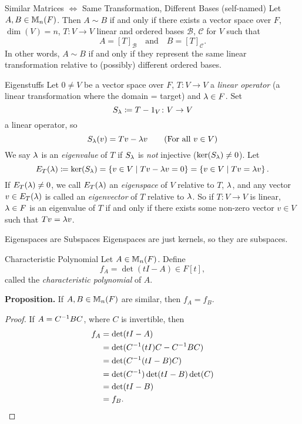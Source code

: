 \documentclass[class=article, crop=false]{standalone}
\begin{document}
  \begin{theorem}{Similar Matrices $\iff$ Same Transformation, Different Bases (self-named)}
    Let $A, B\in \mathbb{M}_n(F)$. Then $A\sim B$ if and only if there exists a vector space over $F$, $\dim(V) = n$, $T\colon V\to V$ linear and ordered bases $\mathcal{B}$, $\mathcal{C}$ for $V$ such that
    \[
      A = [T]_{\mathcal{B}}\quad \text{and} \quad B = [T]_{\mathcal{C}}.
    \]
    In other words, $A\sim B$ if and only if they represent the same linear transformation relative to (possibly) different ordered bases.
  \end{theorem}
  \begin{definition}{Eigenstuffs}
    Let $0\neq V$ be a vector space over $F$, $T\colon V\to V$ a \emph{linear operator} (a linear transformation where the domain = target) and $\lambda\in F$. Set
    \[
      S_{\lambda}\coloneqq T - 1_V\colon V\to V
    \]
    a linear operator, so
    \[
      S_{\lambda}(v) = Tv - \lambda v \tag{For all $v\in V$}
    \]
    We say $\lambda$ is an \emph{eigenvalue} of $T$ if $S_{\lambda}$ is \emph{not} injective ($\ker(S_{\lambda})\neq 0$).
    Let
    \[
      E_T(\lambda)\coloneqq \ker(S_{\lambda}) = \left\{v\in V\mid Tv - \lambda v = 0\right\} = \left\{v\in V\mid Tv = \lambda v\right\}.
    \]
    If $E_T(\lambda)\neq 0$, we call $E_T(\lambda)$ an \emph{eigenspace} of $V$ relative to $T$, $\lambda$, and any vector $v\in E_T(\lambda)$ is called an \emph{eigenvector} of $T$ relative to $\lambda$. So if $T\colon V\to V$ is linear, $\lambda\in F$ is an eigenvalue of $T$ if and only if there exists some non-zero vector $v\in V$ such that $Tv = \lambda v$.
  \end{definition}
  \begin{note}{Eigenspaces are Subspaces}
    Eigenspaces are just kernels, so they are subspaces.
  \end{note}
  \begin{definition}{Characteristic Polynomial}
    Let $A\in \mathbb{M}_n(F)$. Define
    \[
      f_A = \det(tI - A)\in F[t],
    \]
    called the \emph{characteristic polynomial} of $A$.
  \end{definition}
  \textbf{Proposition.} If $A, B\in \mathbb{M}_n(F)$ are similar, then $f_A = f_B$.
  \begin{proof}
    If $A = C^{-1} BC$, where $C$ is invertible, then 
    \begin{align*}
      f_A &= \det(tI - A) \\
          &= \det(C^{-1}(tI)C - C^{-1} BC) \\
          &= \det(C^{-1} (tI - B)C) \\
          &= \det(C^{-1})\det(tI-B)\det(C) \\
          &= \det(tI-B) \\
          &= f_B.
    \end{align*}
  \end{proof}
\end{document}
